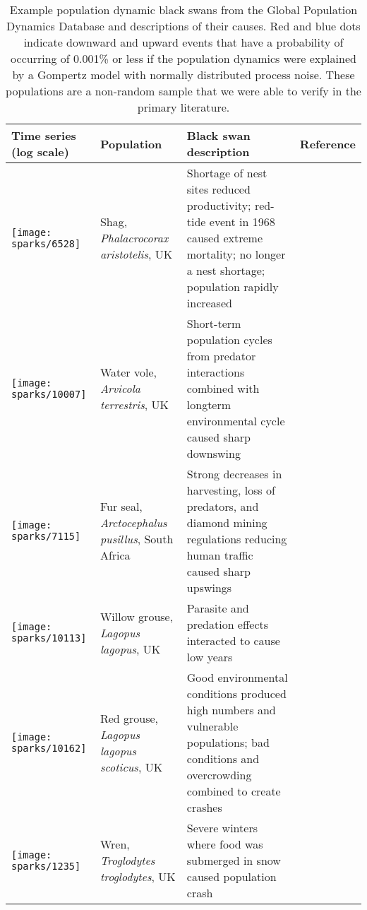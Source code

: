 \documentclass[12pt]{article}
\begin{document}
\begin{small}
\begin{longtable}{>{\RaggedRight}m{2.0cm}>{\RaggedRight}p{3.0cm}>{\RaggedRight}p{7.0cm}>{\RaggedRight}p{2.0cm}}

\caption{Example population dynamic black swans from the Global Population Dynamics Database and descriptions of their causes. Red and blue dots indicate downward and upward events that have a probability of occurring of 0.001\% or less if the population dynamics were explained by a Gompertz model with normally distributed process noise. These populations are a non-random sample that we were able to verify in the primary literature.}\\

\toprule
Time series (log scale) & Population & Black swan description & Reference \\
\midrule

\texttt{[image: sparks/6528]} &
Shag,
\textit{Phalacrocorax aristotelis},
UK &
Shortage of nest sites reduced productivity; red-tide event in 1968 caused extreme mortality; no longer a nest shortage; population rapidly increased &
\citep{potts1980}\\

\texttt{[image: sparks/10007]} &
Water vole,
\textit{Arvicola terrestris},
UK &
Short-term population cycles from predator interactions combined with longterm environmental cycle caused sharp downswing  &
\citep{saucy1994}\\

\texttt{[image: sparks/7115]} &
Fur seal,
\textit{Arctocephalus pusillus},
South Africa &
Strong decreases in harvesting, loss of predators, and diamond mining regulations reducing human traffic caused sharp upswings  &
\citep{shaughnessy1982}\\

\texttt{[image: sparks/10113]} &
Willow grouse,
\textit{Lagopus lagopus},
UK &
Parasite and predation effects interacted to cause low years  &
\citep{dobson1995}\\

\texttt{[image: sparks/10162]} &
Red grouse,
\textit{Lagopus lagopus scoticus},
UK &
Good environmental conditions produced high numbers and vulnerable populations; bad conditions and overcrowding combined to create crashes  &
\citep{mackenzie1952}\\

\texttt{[image: sparks/1235]} &
Wren,
\textit{Troglodytes troglodytes},
UK &
Severe winters where food was submerged in snow caused population crash &
\citep{newton1998} \\


\end{longtable}
\end{small}
\end{document}

